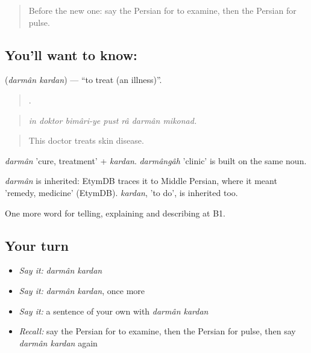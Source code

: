 \begin{quote}
Before the new one: say the Persian for to examine, then the Persian for pulse.
\end{quote}

\subsection*{You'll want to know:  }
\textbf{ } (\emph{darmân kardan}) — \textquotedblleft{}to treat (an illness)\textquotedblright{}.

\begin{quote}
      .
\end{quote}

\begin{quote}
\emph{in doktor bimâri-ye pust râ darmân mikonad.}
\end{quote}

\begin{quote}
This doctor treats skin disease.
\end{quote}

\emph{darmân} 'cure, treatment' + \emph{kardan}. \emph{darmângâh} 'clinic' is built on the same noun.

\begin{cousinweb}
\emph{darmân} is inherited: EtymDB traces it to Middle Persian, where it meant 'remedy, medicine' (EtymDB). \emph{kardan}, 'to do', is inherited too.
\end{cousinweb}

\begin{grammarlens}[title={What you've built}]
One more word for telling, explaining and describing at B1.
\end{grammarlens}

\subsection*{Your turn}
\begin{itemize}
\raggedright
  \item \emph{Say it:} \emph{darmân kardan}
  \item \emph{Say it:} \emph{darmân kardan}, once more
  \item \emph{Say it:} a sentence of your own with \emph{darmân kardan}
  \item \emph{Recall:} say the Persian for to examine, then the Persian for pulse, then say \emph{darmân kardan} again
\end{itemize}

